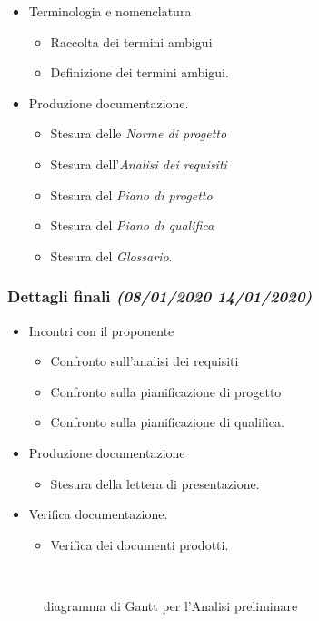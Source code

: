 \documentclass[../piano-di-progetto.tex]{subfiles}
\begin{document}
\begin{itemize}
\begin{itemize}
  \end{itemize}
  \item Terminologia e nomenclatura
  \begin{itemize}
    \item Raccolta dei termini ambigui
    \item Definizione dei termini ambigui.
  \end{itemize}
  \item Produzione documentazione.
  \begin{itemize}
    \item Stesura delle \textit{Norme di progetto}
    \item Stesura dell'\textit{Analisi dei requisiti}
    \item Stesura del \textit{Piano di progetto}
    \item Stesura del \textit{Piano di qualifica}
    \item Stesura del \textit{Glossario}.
  \end{itemize}
\end{itemize}
\subsubsection[Dettagli finali]{Dettagli finali {\normalsize\normalfont\itshape(08/01/2020  14/01/2020)}}%
\label{subs:dettagli_finali}
\begin{itemize}
  \item Incontri con il proponente
  \begin{itemize}
    \item Confronto sull'analisi dei requisiti
    \item Confronto sulla pianificazione di progetto
    \item Confronto sulla pianificazione di qualifica.
  \end{itemize}
  \item Produzione documentazione
  \begin{itemize}
    \item Stesura della lettera di presentazione.
  \end{itemize}
  \item Verifica documentazione.
  \begin{itemize}
    \item Verifica dei documenti prodotti.
  \end{itemize}
\end{itemize}
\begin{figure}[H]
  \centering
  
  \caption{diagramma di Gantt per l'Analisi preliminare}%
~~\label{fig:gantt_analisi_preliminare}
\end{figure}
\end{document}
